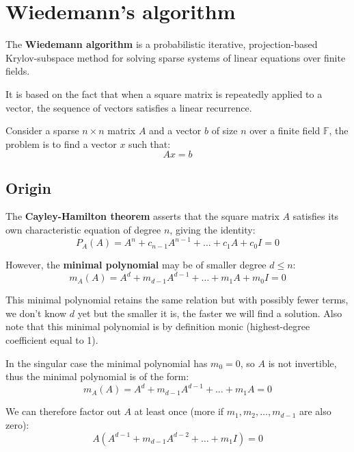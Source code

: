 \documentclass[a4paper, 11pt]{article}
\begin{document}
\section{Wiedemann's algorithm}
The \textbf{Wiedemann algorithm} \cite{wiedemann} is a probabilistic iterative, projection-based Krylov-subspace method for solving sparse systems of linear equations over finite fields. 

It is based on the fact that when a square matrix is repeatedly applied to a
vector, the sequence of vectors satisfies a linear recurrence.

Consider a sparse $n \times n$ matrix $A$ and a vector $b$ of size $n$ over a finite field $\mathbb{F}$, the problem is to find a vector $x$ such that:
\begin{equation}
    Ax = b
\end{equation}

\subsection{Origin}
The \textbf{Cayley-Hamilton theorem} asserts that the square matrix $A$ satisfies its own characteristic equation of degree $n$, giving the identity:
\begin{equation}
    P_A(A) = A^n + c_{n-1}A^{n-1} + \dots + c_1A + c_0I = 0
\end{equation}

However, the \textbf{minimal polynomial} may be of smaller degree $d \leq n$:
\begin{equation}
    \label{eqn:minimal}
    m_A(A) = A^d + m_{d-1}A^{d-1} + \dots + m_1A + m_0I = 0
\end{equation}

This minimal polynomial retains the same relation but with possibly fewer terms, we don't know $d$ yet but the smaller it is, the faster we will find a solution. Also note that this minimal polynomial is by definition monic (highest-degree coefficient equal to 1).

In the singular case the minimal polynomial has $m_0=0$, so $A$ is not invertible, thus the minimal polynomial is of the form:
\begin{equation}
    m_A(A) = A^d + m_{d-1}A^{d-1} + \dots + m_1A = 0
\end{equation}

We can therefore factor out $A$ at least once (more if $m_1, m_2, \dots, m_{d-1}$ are also zero):
\begin{equation}
    A(A^{d-1} + m_{d-1}A^{d-2} + \dots + m_1I) = 0
\end{equation}
 
\end{document}
